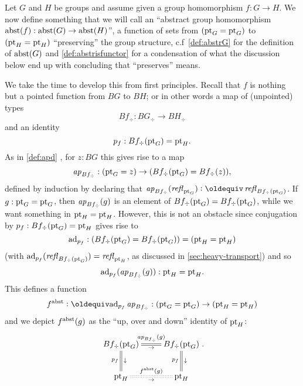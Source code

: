 \begin{definition}\label{def:grouphomomaxioms}
Let $G$ and $H$ be groups and assume given a group homomorphism $f:G\to H$.  We now define something that we will call an ``abstract group homomorphism 
${\mathrm{abst}}(f):\mathrm{abst}(G)\to \mathrm{abst}(H)$'', \ie a function of sets from $({\mathord{\mathrm{pt}}}_G={\mathord{\mathrm{pt}}}_G)$ to $({\mathord{\mathrm{pt}}}_H={\mathord{\mathrm{pt}}}_H)$ ``preserving'' the group structure, c.f~\cref{def:abstrG} for the definition of $\mathrm{abst}(G)$ and \cref{def:abstrisfunctor} for a condensation of what the discussion below end up with concluding that ``preserves'' means.  

We take the time to develop this from first principles.
Recall that $f$ is nothing but a pointed function from $BG$ to $BH$; or in other words a map of (unpointed) types 
$$Bf_\div\colon BG_\div\to BH_\div$$ 
and an identity 
$$p_f: Bf_\div({\mathord{\mathrm{pt}}}_G)={\mathord{\mathrm{pt}}}_H.$$  
As in \cref{def:apd}%
, for $z:BG$ this gives rise to a map 
$$\mathop{{\it ap}_{Bf_\div}}:({\mathord{\mathrm{pt}}}_G=z)\to (Bf_\div({\mathord{\mathrm{pt}}}_G)=Bf_\div(z)),$$ 
defined by induction by declaring that $\ap{Bf_\div}(\refl{\pt_G})\defequi \refl{Bf_\div(\pt_G)}$.  
If $g:{\mathord{\mathrm{pt}}}_G={\mathord{\mathrm{pt}}}_G$, then $\mathop{{\it ap}_{Bf_\div}}(g)$ is an element of $Bf_\div({\mathord{\mathrm{pt}}}_G)=Bf_\div({\mathord{\mathrm{pt}}}_G)$, while we want something in ${\mathord{\mathrm{pt}}}_H={\mathord{\mathrm{pt}}}_H$.  However, this is not an obstacle since conjugation by $p_f: Bf_\div({\mathord{\mathrm{pt}}}_G)={\mathord{\mathrm{pt}}}_H$ gives rise to 
$$\mathrm{ad}_{p_f}:(Bf_\div({\mathord{\mathrm{pt}}}_G)=Bf_\div({\mathord{\mathrm{pt}}}_G))=({\mathord{\mathrm{pt}}}_H={\mathord{\mathrm{pt}}}_H)$$ (with $\mathrm{ad}_{p_f}(\mathop{{\it refl}_{Bf_\div({\mathord{\mathrm{pt}}}_G)}})=\mathop{{\it refl}_{{\mathord{\mathrm{pt}}}_H}}$, as discussed in \cref{sec:heavy-transport}) and so 
$$\mathrm{ad}_{p_f}(\mathop{{\it ap}_{Bf_\div}}(g)):{\mathord{\mathrm{pt}}}_H={\mathord{\mathrm{pt}}}_H.$$
This defines a function
$$f^\abstr\defequi \mathrm{ad}_{p_f}\ap{Bf_\div}:(\pt_G=\pt_G)\to(\pt_H=\pt_H)$$  
and we depict $f^{\mathrm{abst}}(g)$ as the ``up, over and down'' identity of ${\mathord{\mathrm{pt}}}_H$:
$$\xymatrix{Bf_\div(\pt_G)\ar@{=}[r]^{\ap{Bf_\div}(g)}_\to\ar@{=}[d]^\downarrow_{p_f}&Bf_\div(\pt_G)\ar@{=}[d]^\downarrow_{p_f}\\
\pt_H\ar@{:}[r]^{f^\abstr(g)}_\to&\pt_H}.$$




\end{definition}
